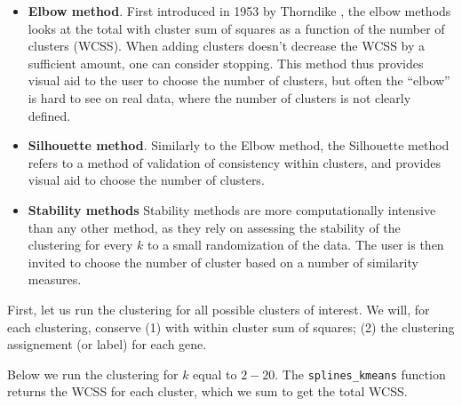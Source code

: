 \documentclass[9pt,a4paper,]{extarticle}
\newenvironment{Shaded}{\begin{snugshade}}{\end{snugshade}}
\newcommand{\ControlFlowTok}[1]{\textcolor[rgb]{0.13,0.29,0.53}{\textbf{#1}}}
\newcommand{\DataTypeTok}[1]{\textcolor[rgb]{0.13,0.29,0.53}{#1}}
\newcommand{\DecValTok}[1]{\textcolor[rgb]{0.00,0.00,0.81}{#1}}
\newcommand{\KeywordTok}[1]{\textcolor[rgb]{0.13,0.29,0.53}{\textbf{#1}}}
\newcommand{\NormalTok}[1]{#1}
\newcommand{\OperatorTok}[1]{\textcolor[rgb]{0.81,0.36,0.00}{\textbf{#1}}}
\newcommand{\StringTok}[1]{\textcolor[rgb]{0.31,0.60,0.02}{#1}}
\begin{document}
\begin{itemize}
\tightlist
\item
  \textbf{Elbow method}. First introduced in 1953 by Thorndike \citep{thorndike:who},
  the elbow methods looks at the total with cluster sum of squares
  as a function of the number of clusters (WCSS). When adding clusters
  doesn't decrease the WCSS by a sufficient
  amount, one can consider stopping. This method thus provides visual aid to
  the user to choose the number of clusters, but often the ``elbow'' is hard to
  see on real data, where the number of clusters is not clearly defined.
\item
  \textbf{Silhouette method}. Similarly to the Elbow method, the Silhouette method
  refers to a method of validation of consistency within clusters, and
  provides visual aid to choose the number of clusters.
\item
  \textbf{Stability methods} Stability methods are more computationally intensive
  than any other method, as they rely on assessing the stability of the
  clustering for every \(k\) to a small randomization of the data. The user is
  then invited to choose the number of cluster based on a number of similarity
  measures.
\end{itemize}

First, let us run the clustering for all possible clusters of interest. We
will, for each clustering, conserve (1) with within cluster sum of
squares; (2) the clustering assignement (or label) for each gene.

Below we run the clustering for \(k\) equal to \(2-20\). The \texttt{splines\_kmeans}
function returns the WCSS for each cluster, which we sum to get the total
WCSS.

\begin{Shaded}
\end{Shaded}
\end{document}
